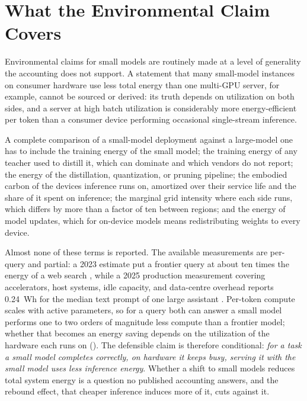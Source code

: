 
\section{What the Environmental Claim Covers}
\label{subsubsec:challenges_env_scope}
\label{supp:energy}

Environmental claims for small models are routinely made at a level of generality the accounting does not support. A statement that many small-model instances on consumer hardware use less total energy than one multi-GPU server, for example, cannot be sourced or derived: its truth depends on utilization on both sides, and a server at high batch utilization is considerably more energy-efficient per token than a consumer device performing occasional single-stream inference.

A complete comparison of a small-model deployment against a large-model one has to include the training energy of the small model; the training energy of any teacher used to distill it, which can dominate and which vendors do not report; the energy of the distillation, quantization, or pruning pipeline; the embodied carbon of the devices inference runs on, amortized over their service life and the share of it spent on inference; the marginal grid intensity where each side runs, which differs by more than a factor of ten between regions; and the energy of model updates, which for on-device models means redistributing weights to every device.

Almost none of these terms is reported. The available measurements are per-query and partial: a 2023 estimate put a frontier query at about ten times the energy of a web search \citep{devries2023energy}, while a 2025 production measurement covering accelerators, host systems, idle capacity, and data-centre overhead reports 0.24~Wh for the median text prompt of one large assistant \citep{elsworth2025google_energy}. Per-token compute scales with active parameters, so for a query both can answer a small model performs one to two orders of magnitude less compute than a frontier model; whether that becomes an energy saving depends on the utilization of the hardware each runs on (\evD). The defensible claim is therefore conditional: \emph{for a task a small model completes correctly, on hardware it keeps busy, serving it with the small model uses less inference energy}. Whether a shift to small models reduces total system energy is a question no published accounting answers, and the rebound effect, that cheaper inference induces more of it, cuts against it.

